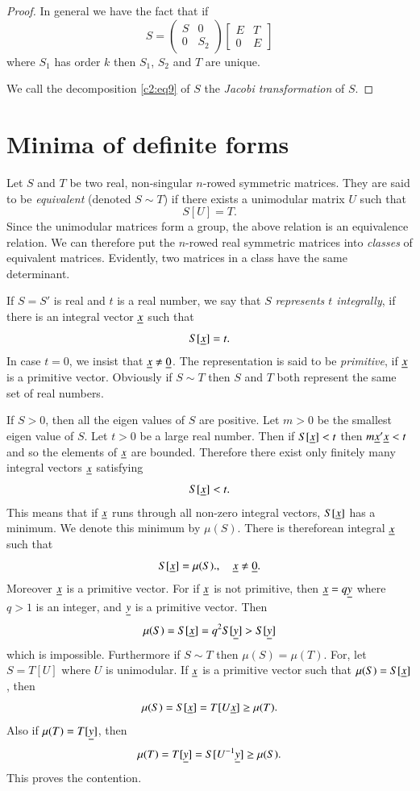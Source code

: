 \begin{proof}
In general we have the fact that if
\begin{equation*}
S=
\begin{pmatrix}
S & 0\\
0 & S_{2}
\end{pmatrix}
\begin{bmatrix}
E & T\\
0 & E
\end{bmatrix}\tag{10}\label{c2:eq10}
\end{equation*}
where $S_{1}$ has order $k$ then $S_{1}$, $S_{2}$ and $T$ are unique.

We call the decomposition \eqref{c2:eq9} of $S$ the {\em Jacobi transformation}
of $S$. 
\end{proof}

\section{Minima of definite forms}\label{chap2:sec2}\pageoriginale

Let $S$ and $T$ be two real, non-singular $n$-rowed symmetric
matrices. They are said to be {\em equivalent} (denoted $S\sim T$) if
there exists a unimodular matrix $U$ such that
$$
S[U]=T.
$$
Since the unimodular matrices form a group, the above relation is an
equivalence relation. We can therefore put the $n$-rowed real
symmetric matrices into {\em classes} of equivalent
matrices. Evidently, two matrices in a class have the same
determinant.

If $S=S'$ is real and $t$ is a real number, we say that $S$ {\em
  represents $t$ integrally}, if there is an integral vector $\underline{x}$
such that
$$
S[\underline{x}]=t.
$$
In case $t=0$, we insist that $\underline{x}\neq \underline{0}$. The representation
is said to be {\em primitive}, if $\underline{x}$ is a primitive
vector. Obviously if $S\sim T$ then $S$ and $T$ both represent the
same set of real numbers.

If $S>0$, then all the eigen values of $S$ are positive. Let $m>0$ be
the smallest eigen value of $S$. Let $t>0$ be a large real
number. Then if $S[\underline{x}]<t$ then $m\underline{x}'\underline{x}<t$ and so the
elements of $\underline{x}$ are bounded. Therefore there exist only finitely
many integral vectors $\underline{x}$ satisfying
$$
S[\underline{x}]<t.
$$
This means that if $\underline{x}$ runs through all non-zero integral
vectors, $S[\underline{x}]$ has a minimum. We denote this minimum by
$\mu(S)$. There is therefore\pageoriginale an integral $\underline{x}$ such that
$$
S[\underline{x}]=\mu(S).,\quad \underline{x}\neq \underline{0}. 
$$
Moreover $\underline{x}$ is a primitive vector. For if $\underline{x}$ is not
primitive, then $\underline{x}=q\underline{y}$ where $q>1$ is an integer, and
$\underline{y}$ is a primitive vector. Then 
$$
\mu(S)=S[\underline{x}]=q^{2}S[\underline{y}]>S[\underline{y}]
$$
which is impossible. Furthermore if $S\sim T$ then
$\mu(S)=\mu(T)$. For, let $S=T[U]$ where $U$ is unimodular. If
$\underline{x}$ is a primitive vector such that $\mu(S)=S[\underline{x}]$, then 
$$
\mu(S)=S[\underline{x}]=T[U\underline{x}]\geq \mu(T).
$$
Also if $\mu(T)=T[\underline{y}]$, then
$$
\mu(T)=T[\underline{y}]=S[U^{-1}\underline{y}]\geq \mu(S).
$$
This proves the contention.

